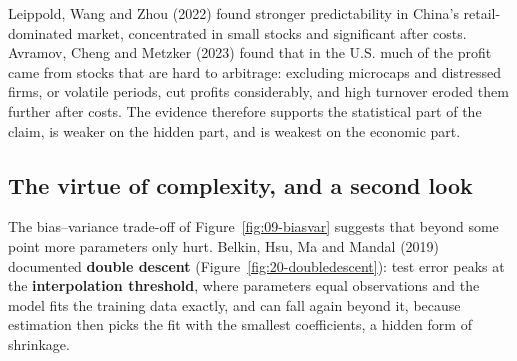 Leippold, Wang and Zhou (2022) found stronger predictability in China's retail-dominated market, concentrated in small stocks and significant after costs. Avramov, Cheng and Metzker (2023) found that in the U.S. much of the profit came from stocks that are hard to arbitrage: excluding microcaps and distressed firms, or volatile periods, cut profits considerably, and high turnover eroded them further after costs. The evidence therefore supports the statistical part of the claim, is weaker on the hidden part, and is weakest on the economic part.

\subsection{The virtue of complexity, and a second look}
\label{sec:20-complexity}

The bias--variance trade-off of Figure~\ref{fig:09-biasvar} suggests that beyond some point more parameters only hurt. Belkin, Hsu, Ma and Mandal (2019) documented \textbf{double descent} (Figure~\ref{fig:20-doubledescent}): test error peaks at the \textbf{interpolation threshold}, where parameters equal observations and the model fits the training data exactly, and can fall again beyond it, because estimation then picks the fit with the smallest coefficients, a hidden form of shrinkage.


